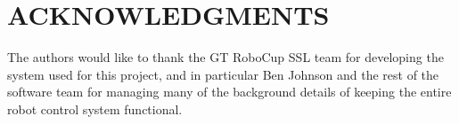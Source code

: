 \documentclass[a4paper, 10pt, conference]{ieeeconf}      %
\begin{document}

\section{ACKNOWLEDGMENTS}

The authors would like to thank the GT RoboCup SSL team for developing the system used for this project, and in particular Ben Johnson and the rest of the software team for managing many of the background details of keeping the entire robot control system functional. 




\end{document}
